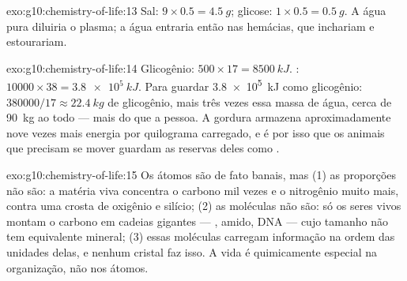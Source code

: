 \begin{solution}{exo:g10:chemistry-of-life:13}
Sal: $9 \times 0.5 = \qty{4.5}{g}$; glicose: $1 \times 0.5 =
\qty{0.5}{g}$. A água pura diluiria o plasma; a água entraria então nas
hemácias, que inchariam e estourariam.
\end{solution}

\begin{solution}{exo:g10:chemistry-of-life:14}
Glicogênio: $500 \times 17 = \qty{8500}{kJ}$. : $10000 \times 38 =
\qty{3.8e5}{kJ}$. Para guardar \qty{3.8e5}{kJ} como glicogênio: $380000/17
\approx \qty{22.4}{kg}$ de glicogênio, mais três vezes essa
massa de água, cerca de \qty{90}{kg} ao todo --- mais do que a pessoa. A
gordura armazena aproximadamente nove vezes mais energia por quilograma
carregado, e é por isso que os animais que precisam se mover guardam as
reservas deles como .
\end{solution}

\begin{solution}{exo:g10:chemistry-of-life:15}
Os átomos são de fato banais, mas (1) as proporções não são: a matéria
viva concentra o carbono mil vezes e o nitrogênio muito mais, contra
uma crosta de oxigênio e silício; (2) as moléculas não são: só os seres
vivos montam o carbono em cadeias gigantes --- , amido, DNA ---
cujo tamanho não tem equivalente mineral; (3) essas moléculas carregam
informação na ordem das unidades delas, e nenhum cristal faz isso. A
vida é quimicamente especial na organização, não nos átomos.
\end{solution}

